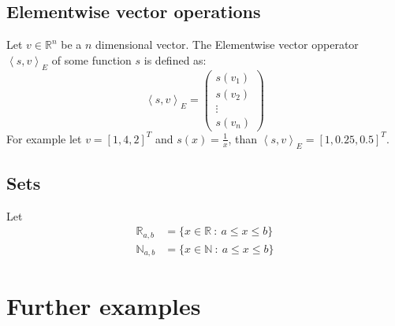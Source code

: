 \documentclass[12pt]{article}
\begin{document}
\subsection{Elementwise vector operations}
Let \(v \in \mathbb R^n\) be a \(n\) dimensional vector.
The Elementwise vector opperator \(\left<s, v\right>_{E}\) of some function \(s\) is defined as:
\begin{equation}\label{eq:vectorElemetwise}
\left<s, v\right>_E = \left(\begin{matrix}
s(v_1) \\
s(v_2) \\
\vdots\\
s(v_n)
\end{matrix}\right)
\end{equation}
For example let \(v = [1, 4, 2]^T\) and \(s(x) = \frac{1}{x}\), than \(\left<s, v\right>_E = [1, 0.25, 0.5]^T\).


\subsection{Sets}
Let
\begin{align}\label{set:Rab}
\mathbb R_{a, b} &= \{x \in \mathbb R~:~ a\leq x \leq b\}\\ \label{set:Nab}
\mathbb N_{a,b} & = \{x \in \mathbb N~:~a\leq x \leq b\}
\end{align}

\section{Further examples}
\end{document}
